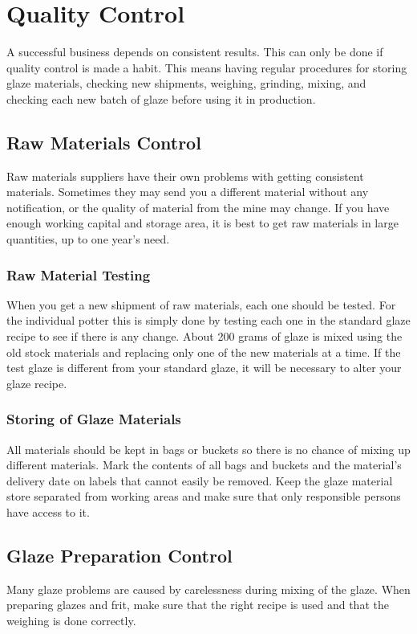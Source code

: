 \chapter{Quality Control}
A successful business depends on consistent results. This can only be done if 
quality control is made a habit. This means having regular procedures for 
storing glaze materials, checking new shipments, weighing, grinding, mixing, 
and checking each new batch of glaze before using it in production.
\section{Raw Materials Control}
Raw materials suppliers have their own problems with getting consistent 
materials. Sometimes they may send you a different material without any 
notification, or the quality of material from the mine may change. If you have 
enough working capital and storage area, it is best to get raw materials in 
large quantities, up to one year's need.
\subsection{Raw Material Testing}
When you get a new shipment of raw materials, each one should be tested. For 
the individual potter this is simply done by testing each one in the standard 
glaze recipe to see if there is any change. About 200 grams of glaze is mixed 
using the old stock materials and replacing only one of the new materials at a 
time. If the test glaze is different from your standard glaze, it will be 
necessary to alter your glaze recipe.
\subsection{Storing of Glaze Materials}
All materials should be kept in bags or buckets so there is no chance of mixing 
up different materials. Mark the contents of all bags and buckets and the 
material's delivery date on labels that cannot easily be removed. Keep the 
glaze material store separated from working areas and make sure that only 
responsible persons have access to it.
\section{Glaze Preparation Control}
Many glaze problems are caused by carelessness during mixing of the glaze. When 
preparing glazes and frit, make sure that the right recipe is used and that the 
weighing is done correctly.
